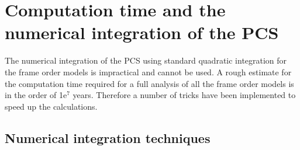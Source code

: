 


\section{Computation time and the numerical integration of the PCS}

The numerical integration of the PCS using standard quadratic integration for the frame order models is impractical and cannot be used.
A rough estimate for the computation time required for a full analysis of all the frame order models is in the order of 1e$^7$ years.
Therefore a number of tricks have been implemented to speed up the calculations.




\subsection{Numerical integration techniques}

